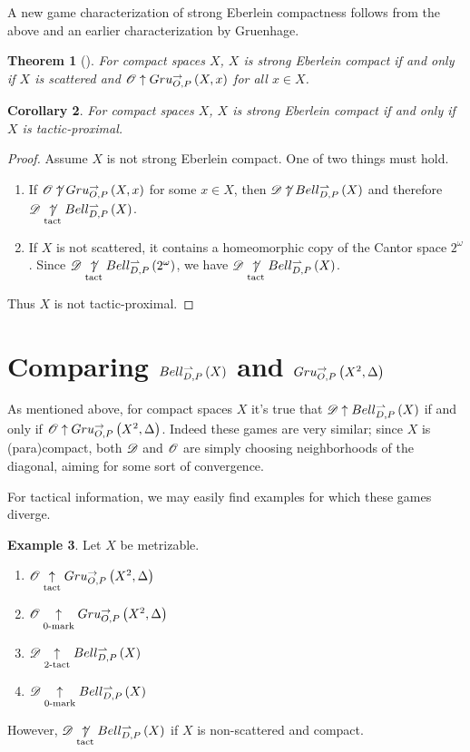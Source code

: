 \documentclass{amsart}
\newtheorem{theorem}{Theorem}[section]
\newtheorem{corollary}[theorem]{Corollary}
\theoremstyle{definition}
\newtheorem{example}[theorem]{Example}
\begin{document}
  A new game characterization of strong Eberlein compactness follows
  from the above and an earlier characterization by Gruenhage.

  \begin{theorem}[\cite{MR752278}]
    For compact spaces \(X\),
    \(X\) is strong Eberlein compact if and only if
    \(X\) is scattered and \(\mathscr{O}\uparrow Gru_{O,P}^{\to}\left({X},{x}\right)\) for all \(x\in X\).
  \end{theorem}

  \begin{corollary}\label{mainResult}
    For compact spaces \(X\),
    \(X\) is strong Eberlein compact if and only if
    \(X\) is tactic-proximal.
  \end{corollary}

  \begin{proof}
    Assume \(X\) is not strong Eberlein compact. One of two things must hold.
      \begin{enumerate}
        \item
          If \(\mathscr{O}\not\uparrow Gru_{O,P}^{\to}\left({X},{x}\right)\) for some \(x\in X\), then
          \(\mathscr{D}\not\uparrow Bell_{D,P}^{\rightharpoonup}\left({X}\right)\) and therefore
          \(\mathscr{D}\underset{\text{tact}}{\not\uparrow} Bell_{D,P}^{\rightharpoonup}\left({X}\right)\).
        \item
          If \(X\) is not scattered, it contains a homeomorphic copy
          of the Cantor space \(2^\omega\). Since
          \(\mathscr{D}\underset{\text{tact}}{\not\uparrow} Bell_{D,P}^{\rightharpoonup}\left({2^\omega}\right)\),
          we have
          \(\mathscr{D}\underset{\text{tact}}{\not\uparrow} Bell_{D,P}^{\rightharpoonup}\left({X}\right)\).
      \end{enumerate}
    Thus \(X\) is not tactic-proximal.
  \end{proof}

\section{Comparing \(Bell_{D,P}^{\rightharpoonup}\left({X}\right)\) and \(Gru_{O,P}^{\to}\left({X^2},{\Delta}\right)\)}

  As mentioned above, for compact spaces \(X\) it's true that
  \(\mathscr{D}\uparrow Bell_{D,P}^{\rightharpoonup}\left({X}\right)\) if and only if
  \(\mathscr{O}\uparrow Gru_{O,P}^{\to}\left({X^2},{\Delta}\right)\). Indeed these games are very similar;
  since \(X\) is (para)compact, both \(\mathscr{D}\) and \(\mathscr{O}\) are simply
  choosing neighborhoods of the diagonal, aiming for some sort of convergence.

  For tactical information, we may easily find examples for which
  these games diverge.

  \begin{example}
    Let \(X\) be metrizable.
      \begin{enumerate}
        \item
          \(\mathscr{O}\underset{\text{tact}}{\uparrow}Gru_{O,P}^{\to}\left({X^2},{\Delta}\right)\)
        \item
          \(\mathscr{O}\underset{0\text{-mark}}{\uparrow}Gru_{O,P}^{\to}\left({X^2},{\Delta}\right)\)
        \item
          \(\mathscr{D}\underset{2\text{-tact}}{\uparrow}Bell_{D,P}^{\rightharpoonup}\left({X}\right)\)
        \item
          \(\mathscr{D}\underset{0\text{-mark}}{\uparrow}Bell_{D,P}^{\rightharpoonup}\left({X}\right)\)
      \end{enumerate}
    However, \(\mathscr{D}\underset{\text{tact}}{\not\uparrow}Bell_{D,P}^{\rightharpoonup}\left({X}\right)\) if \(X\) is non-scattered
    and compact.
  \end{example}
\end{document}

